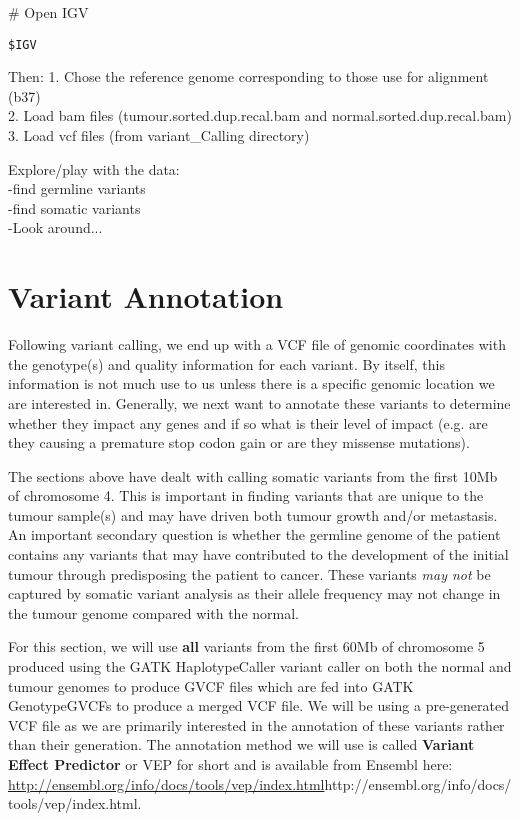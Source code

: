 \# Open IGV
\begin{lstlisting}
$IGV
\end{lstlisting}

Then:
   1. Chose the reference genome corresponding to those use for alignment (b37) \\
   2. Load bam files (tumour.sorted.dup.recal.bam and normal.sorted.dup.recal.bam) \\
   3. Load vcf files (from variant_Calling directory)

Explore/play with the data: \\ 
   -find germline variants \\
   -find somatic variants \\
   -Look around...

\newpage



\section{Variant Annotation}

Following variant calling, we end up with a VCF file of genomic coordinates with the genotype(s) and quality information for each variant. By itself, this information is not much use to us unless there is a specific genomic location we are interested in. Generally, we next want to annotate these variants to determine whether they impact any genes and if so what is their level of impact (e.g. are they causing a premature stop codon gain or are they missense mutations).

The sections above have dealt with calling somatic variants from the first 10Mb of chromosome 4. This is important in finding variants that are unique to the tumour sample(s) and may have driven both tumour growth and/or metastasis. An important secondary question is whether the germline genome of the patient contains any variants that may have contributed to the development of the initial tumour through predisposing the patient to cancer. These variants \textit{may not} be captured by somatic variant analysis as their allele frequency may not change in the tumour genome compared with the normal.

For this section, we will use \textbf{all} variants from the first 60Mb of chromosome 5 produced using the GATK HaplotypeCaller variant caller on both the normal and tumour genomes to produce GVCF files which are fed into GATK GenotypeGVCFs to produce a merged VCF file. We will be using a pre-generated VCF file as we are primarily interested in the annotation of these variants rather than their generation. The annotation method we will use is called \textbf{Variant Effect Predictor} or VEP for short and is available from Ensembl here: \url{http://ensembl.org/info/docs/tools/vep/index.html}{http://ensembl.org/info/docs/tools/vep/index.html}.

